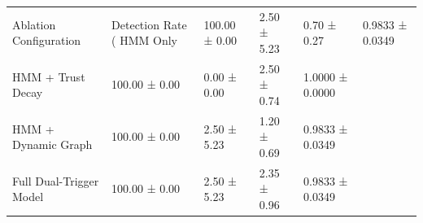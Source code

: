\begin{tabular}{lllll}
\toprule
Ablation Configuration & Detection Rate (%
\midrule
HMM Only & 100.00 ± 0.00 & 2.50 ± 5.23 & 0.70 ± 0.27 & 0.9833 ± 0.0349 \\
HMM + Trust Decay & 100.00 ± 0.00 & 0.00 ± 0.00 & 2.50 ± 0.74 & 1.0000 ± 0.0000 \\
HMM + Dynamic Graph & 100.00 ± 0.00 & 2.50 ± 5.23 & 1.20 ± 0.69 & 0.9833 ± 0.0349 \\
Full Dual-Trigger Model & 100.00 ± 0.00 & 2.50 ± 5.23 & 2.35 ± 0.96 & 0.9833 ± 0.0349 \\
\bottomrule
\end{tabular}

